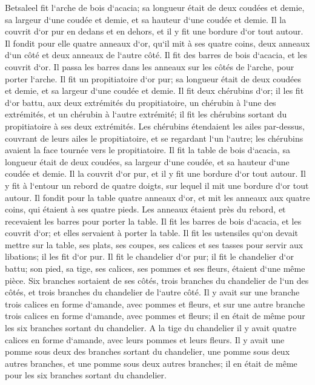 \verse Betsaleel fit l`arche de bois d`acacia; sa longueur était de deux coudées et demie, sa largeur d`une coudée et demie, et sa hauteur d`une coudée et demie. 
\verse Il la couvrit d`or pur en dedans et en dehors, et il y fit une bordure d`or tout autour. 
\verse Il fondit pour elle quatre anneaux d`or, qu`il mit à ses quatre coins, deux anneaux d`un côté et deux anneaux de l`autre côté. 
\verse Il fit des barres de bois d`acacia, et les couvrit d`or. 
\verse Il passa les barres dans les anneaux sur les côtés de l`arche, pour porter l`arche. 
\verse Il fit un propitiatoire d`or pur; sa longueur était de deux coudées et demie, et sa largeur d`une coudée et demie. 
\verse Il fit deux chérubins d`or; il les fit d`or battu, aux deux extrémités du propitiatoire, 
\verse un chérubin à l`une des extrémités, et un chérubin à l`autre extrémité; il fit les chérubins sortant du propitiatoire à ses deux extrémités. 
\verse Les chérubins étendaient les ailes par-dessus, couvrant de leurs ailes le propitiatoire, et se regardant l`un l`autre; les chérubins avaient la face tournée vers le propitiatoire. 
\verse Il fit la table de bois d`acacia, sa longueur était de deux coudées, sa largeur d`une coudée, et sa hauteur d`une coudée et demie. 
\verse Il la couvrit d`or pur, et il y fit une bordure d`or tout autour. 
\verse Il y fit à l`entour un rebord de quatre doigts, sur lequel il mit une bordure d`or tout autour. 
\verse Il fondit pour la table quatre anneaux d`or, et mit les anneaux aux quatre coins, qui étaient à ses quatre pieds. 
\verse Les anneaux étaient près du rebord, et recevaient les barres pour porter la table. 
\verse Il fit les barres de bois d`acacia, et les couvrit d`or; et elles servaient à porter la table. 
\verse Il fit les ustensiles qu`on devait mettre sur la table, ses plats, ses coupes, ses calices et ses tasses pour servir aux libations; il les fit d`or pur. 
\verse Il fit le chandelier d`or pur; il fit le chandelier d`or battu; son pied, sa tige, ses calices, ses pommes et ses fleurs, étaient d`une même pièce. 
\verse Six branches sortaient de ses côtés, trois branches du chandelier de l`un des côtés, et trois branches du chandelier de l`autre côté. 
\verse Il y avait sur une branche trois calices en forme d`amande, avec pommes et fleurs, et sur une autre branche trois calices en forme d`amande, avec pommes et fleurs; il en était de même pour les six branches sortant du chandelier. 
\verse A la tige du chandelier il y avait quatre calices en forme d`amande, avec leurs pommes et leurs fleurs. 
\verse Il y avait une pomme sous deux des branches sortant du chandelier, une pomme sous deux autres branches, et une pomme sous deux autres branches; il en était de même pour les six branches sortant du chandelier. 
